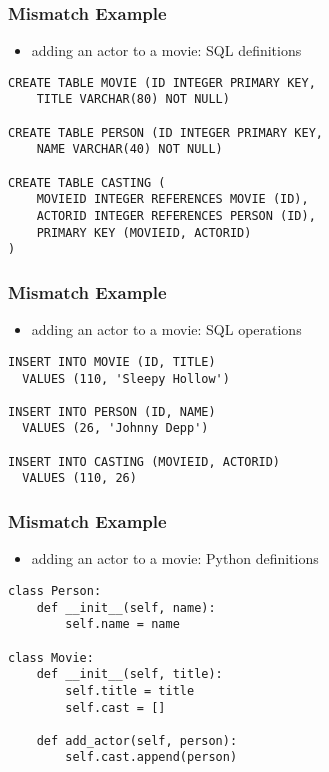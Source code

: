 \documentclass[dvipsnames]{beamer}
\theoremstyle{plain}
\begin{document}
\begin{frame}[fragile]
  \frametitle{Mismatch Example}

  \begin{itemize}
    \item adding an actor to a movie: SQL definitions
  \end{itemize}

  \begin{lstlisting}[language=FullSQL]
CREATE TABLE MOVIE (ID INTEGER PRIMARY KEY,
    TITLE VARCHAR(80) NOT NULL)

CREATE TABLE PERSON (ID INTEGER PRIMARY KEY,
    NAME VARCHAR(40) NOT NULL)

CREATE TABLE CASTING (
    MOVIEID INTEGER REFERENCES MOVIE (ID),
    ACTORID INTEGER REFERENCES PERSON (ID),
    PRIMARY KEY (MOVIEID, ACTORID)
)
  \end{lstlisting}
\end{frame}

\begin{frame}[fragile]
  \frametitle{Mismatch Example}

  \begin{itemize}
    \item adding an actor to a movie: SQL operations
  \end{itemize}

  \begin{lstlisting}[language=FullSQL]
INSERT INTO MOVIE (ID, TITLE)
  VALUES (110, 'Sleepy Hollow')

INSERT INTO PERSON (ID, NAME)
  VALUES (26, 'Johnny Depp')

INSERT INTO CASTING (MOVIEID, ACTORID)
  VALUES (110, 26)
  \end{lstlisting}
\end{frame}

\begin{frame}[fragile]
  \frametitle{Mismatch Example}

  \begin{itemize}
    \item adding an actor to a movie: Python definitions
  \end{itemize}

  \begin{lstlisting}
class Person:
    def __init__(self, name):
        self.name = name

class Movie:
    def __init__(self, title):
        self.title = title
        self.cast = []

    def add_actor(self, person):
        self.cast.append(person)
  \end{lstlisting}
\end{frame}
\end{document}
